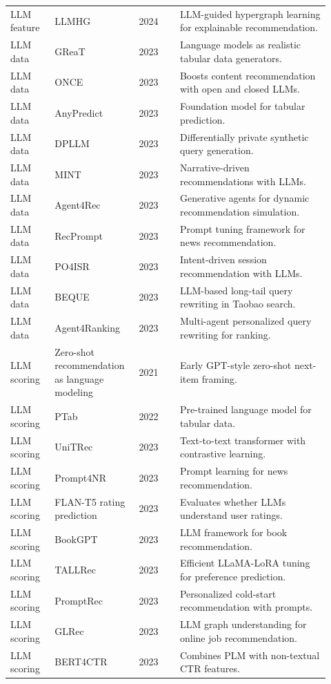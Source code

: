 \documentclass[11pt]{article}
\begin{document}
\begin{longtable}{@{}p{0.13\linewidth}p{0.23\linewidth}p{0.12\linewidth}p{0.44\linewidth}@{}}
LLM feature & LLMHG & 2024 & LLM-guided hypergraph learning for explainable recommendation.\\
LLM data & GReaT & 2023 & Language models as realistic tabular data generators.\\
LLM data & ONCE & 2023 & Boosts content recommendation with open and closed LLMs.\\
LLM data & AnyPredict & 2023 & Foundation model for tabular prediction.\\
LLM data & DPLLM & 2023 & Differentially private synthetic query generation.\\
LLM data & MINT & 2023 & Narrative-driven recommendations with LLMs.\\
LLM data & Agent4Rec & 2023 & Generative agents for dynamic recommendation simulation.\\
LLM data & RecPrompt & 2023 & Prompt tuning framework for news recommendation.\\
LLM data & PO4ISR & 2023 & Intent-driven session recommendation with LLMs.\\
LLM data & BEQUE & 2023 & LLM-based long-tail query rewriting in Taobao search.\\
LLM data & Agent4Ranking & 2023 & Multi-agent personalized query rewriting for ranking.\\
LLM scoring & Zero-shot recommendation as language modeling & 2021 & Early GPT-style zero-shot next-item framing.\\
LLM scoring & PTab & 2022 & Pre-trained language model for tabular data.\\
LLM scoring & UniTRec & 2023 & Text-to-text transformer with contrastive learning.\\
LLM scoring & Prompt4NR & 2023 & Prompt learning for news recommendation.\\
LLM scoring & FLAN-T5 rating prediction & 2023 & Evaluates whether LLMs understand user ratings.\\
LLM scoring & BookGPT & 2023 & LLM framework for book recommendation.\\
LLM scoring & TALLRec & 2023 & Efficient LLaMA-LoRA tuning for preference prediction.\\
LLM scoring & PromptRec & 2023 & Personalized cold-start recommendation with prompts.\\
LLM scoring & GLRec & 2023 & LLM graph understanding for online job recommendation.\\
LLM scoring & BERT4CTR & 2023 & Combines PLM with non-textual CTR features.\\

\end{longtable}
\end{document}
